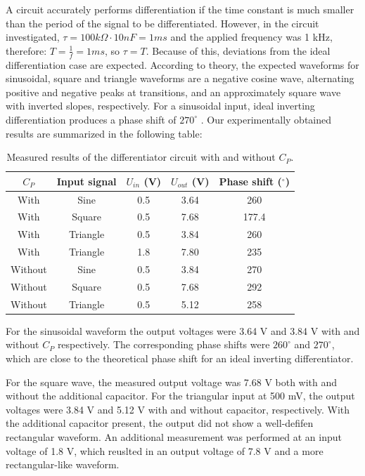 \documentclass[12pt]{article}
\begin{document}
A circuit accurately performs differentiation if the time constant is much smaller than the period of the signal to be differentiated. However, in the circuit investigated, $\tau = 100 k\Omega \cdot 10 nF = 1 ms$ and the applied frequency was 1 kHz, therefore:
            $T = \frac{1}{f}= 1 ms$, so $\tau = T$. Because of this, deviations from the ideal differentiation case are expected. 
According to theory, the expected waveforms for sinusoidal, square and triangle waveforms are a negative cosine wave, alternating positive and negative peaks at transitions, and an approximately square wave with inverted slopes, respectively. For a sinusoidal input, ideal inverting differentiation produces a phase shift of $270^\circ$ \cite{WebbActiveFilters}. Our experimentally obtained results are summarized in the following table: 

\begin{table}[H]
    \centering
    \caption{Measured results of the differentiator circuit with and without $C_P$.}
    \label{tab:differentiator}
    \begin{tabular}{|c|c|c|c|c|}
        \hline
        $C_P$ & Input signal & $U_{in}$ (V) &
        $U_{out}$ (V) & Phase shift ($^\circ$) \\
        \hline
        With & Sine & 0.5 & 3.64 & 260 \\
        \hline
        With & Square & 0.5 & 7.68 & 177.4 \\
        \hline
        With & Triangle & 0.5 & 3.84 & 260 \\
        \hline
        With & Triangle & 1.8 & 7.80 & 235 \\
        \hline
        Without & Sine & 0.5 & 3.84 & 270 \\
        \hline
        Without & Square & 0.5 & 7.68 & 292 \\
        \hline
        Without & Triangle & 0.5 & 5.12 & 258 \\
        \hline
    \end{tabular}
\end{table}

For the sinusoidal waveform the output voltages were 3.64 V and 3.84 V with and without $C_P$ respectively. The corresponding phase shifts were $260^\circ$ and $270^\circ$, which are close to the theoretical phase shift for an ideal inverting differentiator. 

For the square wave, the measured output voltage was 7.68 V both with and without the additional capacitor. For the triangular input at 500 mV, the output voltages were 3.84 V and 5.12 V with and without capacitor, respectively. With the additional capacitor present, the output did not show a well-defifen rectangular waveform. An additional measurement was performed at an input voltage of 1.8 V, which reuslted in an output voltage of 7.8 V and a more rectangular-like waveform. 
\end{document}
